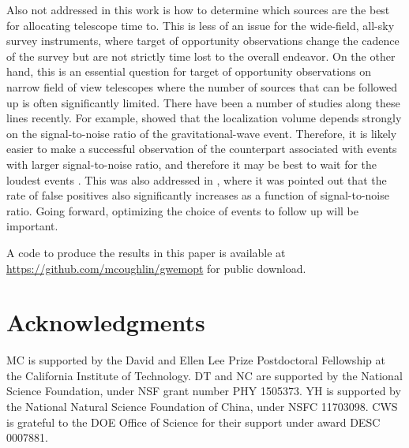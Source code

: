 \documentclass[twocolumn]{aastex62}
\begin{document}
Also not addressed in this work is how to determine which sources are the best for allocating telescope time to. This is less of an issue for the wide-field, all-sky survey instruments, where target of opportunity observations change the cadence of the survey but are not strictly time lost to the overall endeavor. On the other hand, this is an essential question for target of opportunity observations on narrow field of view telescopes where the number of sources that can be followed up is often significantly limited. There have been a number of studies along these lines recently.  For example, \cite{DeBe2018} showed that the localization volume depends strongly on the signal-to-noise ratio of the gravitational-wave event. Therefore, it is likely easier to make a successful observation of the counterpart associated with events with larger signal-to-noise ratio, and therefore it may be best to wait for the loudest events \cite{ChHo2016}. This was also addressed in \cite{LyCo2018}, where it was pointed out that the rate of false positives also significantly increases as a function of signal-to-noise ratio. Going forward, optimizing the choice of events to follow up will be important.

A code to produce the results in this paper is available at 
\url{https://github.com/mcoughlin/gwemopt} for public download.

\section{Acknowledgments}
MC is supported by the David and Ellen Lee Prize Postdoctoral Fellowship at the California Institute of Technology. 
DT and NC are supported by the National Science Foundation, under NSF grant number PHY 1505373.
YH is supported by the National Natural Science Foundation of China, under NSFC 11703098.
CWS is grateful to the DOE Office of Science for their support under award DESC 0007881.



\end{document}
